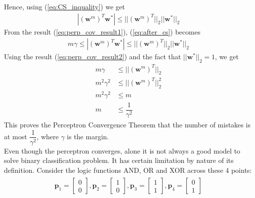 Hence, using (\ref{eq:CS_inquality}) we get
\begin{align}
  \label{eq:after_cs}
  |(\textbf{w}^{m})^T\textbf{w}^{*}| \leq ||(\textbf{w}^{m})^T||_2  ||\textbf{w}^{*}||_2
\end{align}
From the result (\ref{eq:perp_cov_result1}), (\ref{eq:after_cs}) becomes
\begin{align}
  m\gamma \leq |(\textbf{w}^{m})^T\textbf{w}^{*}| \leq ||(\textbf{w}^{m})^T||_2  ||\textbf{w}^{*}||_2
\end{align}
Using the result (\ref{eq:perp_cov_result2}) and the fact that $||\textbf{w}^{*}||_{2} = 1$, we get
\begin{align}
  \nonumber
  m\gamma &\leq ||(\textbf{w}^{m})^T||_2 \\
  m^2 {\gamma}^2 &\leq ||(\textbf{w}^{m})^T||_{2}^{2} \\
  m^2 {\gamma}^2 &\leq m \\
  m &\leq \dfrac{1}{\gamma^2}
\end{align}
This proves the Perceptron Convergence Theorem that the number of mistakes is at most $\dfrac{1}{\gamma^2}$, where $\gamma$ is the margin.\vspace*{5mm}\\
Even though the perceptron converges, alone it is not always a good model to solve binary classification problem. It has certain limitation by nature of its definition. Consider the logic functions AND, OR and XOR across these 4 points:
\begin{align}
  \begin{matrix}
    \textbf{p}_1 = \begin{bmatrix}
      0 \\
      0
    \end{bmatrix},
    \textbf{p}_2 = \begin{bmatrix}
      1 \\
      0
    \end{bmatrix},
    \textbf{p}_3 = \begin{bmatrix}
      1 \\
      1
    \end{bmatrix},
    \textbf{p}_4 = \begin{bmatrix}
      0 \\
      1
    \end{bmatrix}  
  \end{matrix}
\end{align}
